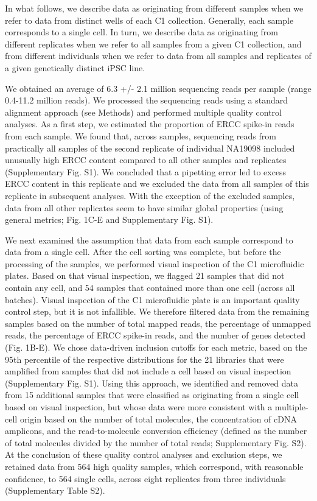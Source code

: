 In what follows, we describe data as originating from different samples
when we refer to data from distinct wells of each C1 collection.
Generally, each sample corresponds to a single cell. In turn, we
describe data as originating from different replicates when we refer to
all samples from a given C1 collection, and from different individuals
when we refer to data from all samples and replicates of a given
genetically distinct iPSC line.

We obtained an average of 6.3 +/- 2.1 million sequencing reads per
sample (range 0.4-11.2 million reads). We processed the sequencing reads
using a standard alignment approach (see Methods) and performed multiple
quality control analyses. As a first step, we estimated the proportion
of ERCC spike-in reads from each sample. We found that, across samples,
sequencing reads from practically all samples of the second replicate of
individual NA19098 included unusually high ERCC content compared to all
other samples and replicates (Supplementary Fig. S1). We concluded that
a pipetting error led to excess ERCC content in this replicate and we
excluded the data from all samples of this replicate in subsequent
analyses. With the exception of the excluded samples, data from all
other replicates seem to have similar global properties (using general
metrics; Fig. 1C-E and Supplementary Fig. S1).

We next examined the assumption that data from each sample correspond to
data from a single cell. After the cell sorting was complete, but before
the processing of the samples, we performed visual inspection of the C1
microfluidic plates. Based on that visual inspection, we flagged 21
samples that did not contain any cell, and 54 samples that contained
more than one cell (across all batches). Visual inspection of the C1
microfluidic plate is an important quality control step, but it is not
infallible. We therefore filtered data from the remaining samples based
on the number of total mapped reads, the percentage of unmapped reads,
the percentage of ERCC spike-in reads, and the number of genes detected
(Fig. 1B-E). We chose data-driven inclusion cutoffs for each metric,
based on the 95th percentile of the respective distributions for the 21
libraries that were amplified from samples that did not include a cell
based on visual inspection (Supplementary Fig. S1). Using this approach,
we identified and removed data from 15 additional samples that were
classified as originating from a single cell based on visual inspection,
but whose data were more consistent with a multiple-cell origin based on
the number of total molecules, the concentration of cDNA amplicons, and
the read-to-molecule conversion efficiency (defined as the number of
total molecules divided by the number of total reads; Supplementary Fig.
S2). At the conclusion of these quality control analyses and exclusion
steps, we retained data from 564 high quality samples, which correspond,
with reasonable confidence, to 564 single cells, across eight replicates
from three individuals (Supplementary Table S2).

